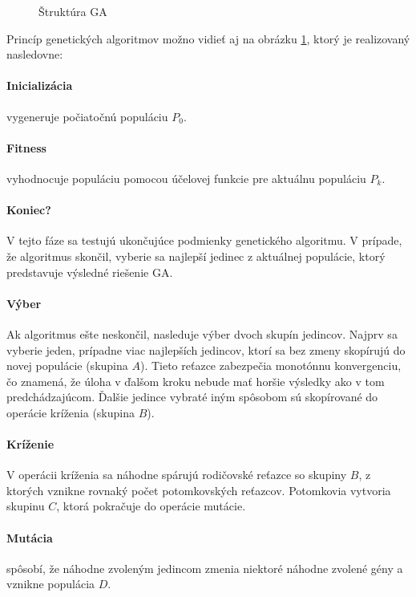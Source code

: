 \begin{figure}[!h]
  \centering
  
  \caption{Štruktúra GA}
  \label{img:ga}
\end{figure}


Princíp genetických algoritmov možno vidieť aj na obrázku \ref{img:ga}, ktorý je realizovaný nasledovne:
  \paragraph{Inicializácia} vygeneruje počiatočnú populáciu $ P_0 $.
  \paragraph{Fitness} vyhodnocuje populáciu pomocou účelovej funkcie pre aktuálnu populáciu $ P_k $.
  \paragraph{Koniec?} V tejto fáze sa testujú ukončujúce podmienky genetického algoritmu.
  V prípade, že algoritmus skončil, vyberie sa najlepší jedinec z aktuálnej populácie, ktorý predstavuje výsledné riešenie GA.
  \paragraph{Výber} Ak algoritmus ešte neskončil, nasleduje výber dvoch skupín jedincov. Najprv sa vyberie jeden, prípadne viac najlepších jedincov, ktorí sa bez zmeny skopírujú
  do novej populácie (skupina $ A $). Tieto reťazce zabezpečia monotónnu konvergenciu, čo znamená, že úloha v ďalšom kroku nebude mať horšie výsledky ako v tom predchádzajúcom.
  Ďalšie jedince vybraté iným spôsobom sú skopírované do operácie kríženia (skupina $ B $).
  \paragraph{Kríženie} V operácii kríženia sa náhodne spárujú rodičovské reťazce so skupiny $ B $, z ktorých vznikne rovnaký počet potomkovských reťazcov.
  Potomkovia vytvoria skupinu $ C $, ktorá pokračuje do operácie mutácie. 
  \paragraph{Mutácia} spôsobí, že náhodne zvoleným jedincom zmenia niektoré náhodne zvolené gény a vznikne populácia $ D $.
